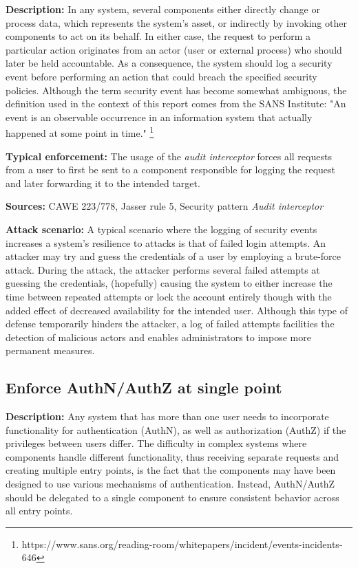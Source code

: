 \textbf{Description:} In any system, several components either directly change or process data, which represents the system's asset, or indirectly by invoking other components to act on its behalf. In either case, the request to perform a particular action originates from an actor (user or external process) who should later be held accountable.  As a consequence, the system should log a security event before performing an action that could breach the specified security policies. Although the term security event has become somewhat ambiguous, the definition used in the context of this report comes from the SANS Institute: "An event is an observable occurrence in an information system that actually happened at some point in time." \footnote{https://www.sans.org/reading-room/whitepapers/incident/events-incidents-646}

\textbf{Typical enforcement:} The usage of the \textit{audit interceptor} forces all requests from a user to first be sent to a component responsible for logging the request and later forwarding it to the intended target. 

\textbf{Sources:} CAWE 223/778, Jasser rule 5, Security pattern \textit{Audit interceptor}

\textbf{Attack scenario:} A typical scenario where the logging of security events increases a system's resilience to attacks is that of failed login attempts. An attacker may try and guess the credentials of a user by employing a brute-force attack. During the attack, the attacker performs several failed attempts at guessing the credentials, (hopefully) causing the system to either increase the time between repeated attempts or lock the account entirely though with the added effect of decreased availability for the intended user. Although this type of defense temporarily hinders the attacker, a log of failed attempts facilities the detection of malicious actors and enables administrators to impose more permanent measures. 

\subsection{Enforce AuthN/AuthZ at single point}
 
 \textbf{Description:} Any system that has more than one user needs to incorporate functionality for authentication (AuthN), as well as authorization (AuthZ) if the privileges between users differ. The difficulty in complex systems where components handle different functionality, thus receiving separate requests and creating multiple entry points, is the fact that the components may have been designed to use various mechanisms of authentication. Instead, AuthN/AuthZ should be delegated to a single component to ensure consistent behavior across all entry points. 
 
